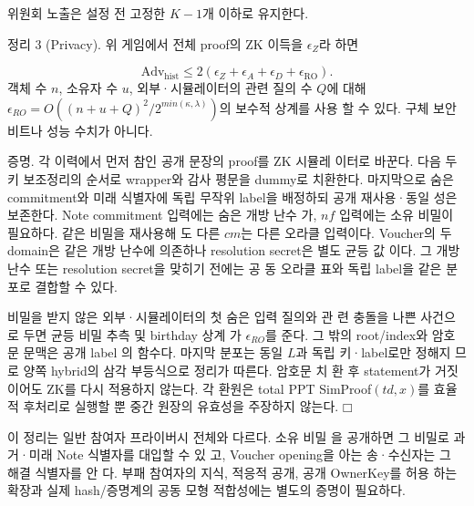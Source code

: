위원회 노출은 설정 전 고정한 \(K−1\)개 이하로 유지한다.

정리 3 (Privacy). 위 게임에서 전체 proof의 ZK 이득을
\(\epsilon _{Z}\)라 하면

\begin{equation}
    \mathrm{Adv}_{\mathrm{hist}}\le2(\epsilon_Z+\epsilon_A+\epsilon_D+\epsilon_{\mathrm{RO}}).\tag{27}
\end{equation}
객체 수 \(n\), 소유자 수 \(u\), 외부·시뮬레이터의 관련 질의 수 \(Q\)에
대해 \(\epsilon _{RO}=O((n+u+Q)^{2}/2^{min(κ,λ)})\)의 보수적 상계를 사용
할 수 있다. 구체 보안 비트나 성능 수치가 아니다.

증명. 각 이력에서 먼저 참인 공개 문장의 proof를 ZK 시뮬레
이터로 바꾼다. 다음 두 키 보조정리의 순서로 wrapper와 감사
평문을 dummy로 치환한다. 마지막으로 숨은 commitment와
미래 식별자에 독립 무작위 label을 배정하되 공개 재사용·동일
성은 보존한다. Note commitment 입력에는 숨은 개방 난수
가, \(nf\) 입력에는 소유 비밀이 필요하다. 같은 비밀을 재사용해
도 다른 \(cm\)는 다른 오라클 입력이다. Voucher의 두 domain은
같은 개방 난수에 의존하나 resolution secret은 별도 균등 값
이다. 그 개방 난수 또는 resolution secret을 맞히기 전에는 공
동 오라클 표와 독립 label을 같은 분포로 결합할 수 있다.

비밀을 받지 않은 외부·시뮬레이터의 첫 숨은 입력 질의와 관
련 충돌을 나쁜 사건으로 두면 균등 비밀 추측 및 birthday 상계
가 \(\epsilon _{RO}\)를 준다. 그 밖의 root/index와 암호문 문맥은 공개 label
의 함수다. 마지막 분포는 동일 \(L\)과 독립 키·label로만 정해지
므로 양쪽 hybrid의 삼각 부등식으로 정리가 따른다. 암호문 치
환 후 statement가 거짓이어도 ZK를 다시 적용하지 않는다. 각
환원은 total PPT SimProof\((td,x)\)를 효율적 후처리로 실행할
뿐 중간 원장의 유효성을 주장하지 않는다. \(□\)

이 정리는 일반 참여자 프라이버시 전체와 다르다. 소유 비밀
을 공개하면 그 비밀로 과거·미래 Note 식별자를 대입할 수 있
고, Voucher opening을 아는 송·수신자는 그 해결 식별자를 안
다. 부패 참여자의 지식, 적응적 공개, 공개 OwnerKey를 허용
하는 확장과 실제 hash/증명계의 공동 모형 적합성에는 별도의
증명이 필요하다.
